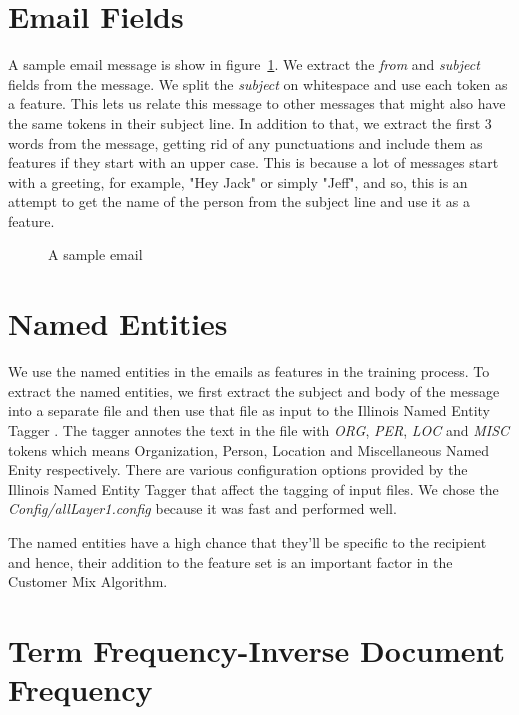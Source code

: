 \documentclass[senior,oneside]{UIUC}
\begin{document}
\section{Email Fields}
\label{sec:email-fields}

A sample email message is show in figure~\ref{fig:sample-email}.
We extract the \emph{from} and \emph{subject} fields from the message. We split the \emph{subject} on whitespace and use each token as a feature. This lets us relate this message to other messages that might also have the same tokens in their subject line. In addition to that, we extract the first 3 words from the message, getting rid of any punctuations and include them as features if they start with an upper case. This is because a lot of messages start with a greeting, for example, "Hey Jack" or simply "Jeff", and so, this is an attempt to get the name of the person from the subject line and use it as a feature.

\begin{figure}
    \caption{A sample email}
    \label{fig:sample-email}
\end{figure}

\section{Named Entities}
\label{sec:named-entities}

We use the named entities in the emails as features in the training process. To extract the named entities, we first extract the subject and body of the message into a separate file and then use that file as input to the Illinois Named Entity Tagger \cite{ner}. The tagger annotes the text in the file with \emph{ORG}, \emph{PER}, \emph{LOC} and \emph{MISC} tokens which means Organization, Person, Location and Miscellaneous Named Enity respectively. There are various configuration options provided by the Illinois Named Entity Tagger that affect the tagging of input files. We chose the \emph{Config/allLayer1.config} because it was fast and performed well.

The named entities have a high chance that they'll be specific to the recipient and hence, their addition to the feature set is an important factor in the Customer Mix Algorithm.

\section{Term Frequency-Inverse Document Frequency}
\label{sec:tf-idf}
\end{document}
